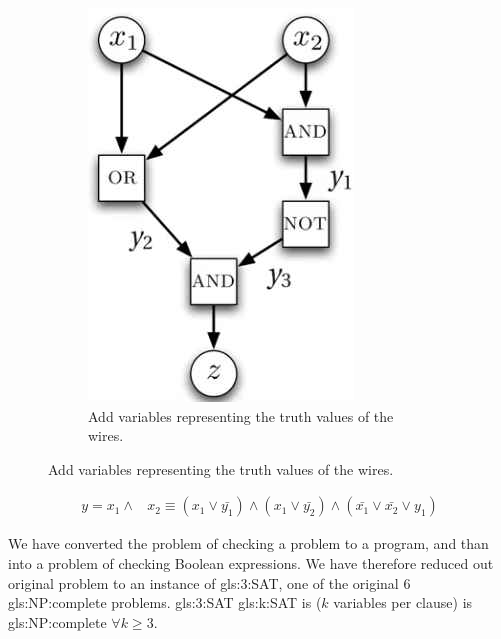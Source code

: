 \documentclass[]{article}
\begin{document}
\begin{figure}[H]
\begin{center}
		\begin{subfigure}[b]{0.45\textwidth}
			\caption{Add variables representing the truth values of the wires.}\label{fig:add:variables}
			\includegraphics[width=\textwidth]{add-variables}
		\end{subfigure}
	\end{center}
\end{figure}

\begin{align*}
	y = x_1 \land& x_2 \equiv (x_1\lor \bar{y_1}) \land (x_1\lor \bar{y_2}) \land (\bar{x_1} \lor \bar{x_2} \lor y_1)
\end{align*}

We have converted the problem of checking a problem to a program, and than into a problem of checking Boolean expressions. We have therefore reduced out original problem to an instance of \gls{gls:3:SAT}, one of the original 6 \gls{gls:NP:complete} problems.
\glsdesc{gls:3:SAT} \Gls{gls:k:SAT} is ($k$ variables per clause) is \gls{gls:NP:complete} $\forall k \ge 3$.
\end{document}
